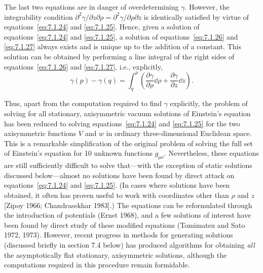 The last two equations are in danger of overdetermining \(\gamma\). However, the
integrability condition
\(\partial^2\gamma/\partial z\partial\rho=
\partial^2\gamma/\partial\rho\partial z\) is identically satisfied by virtue of
equations~\eqref{eq:7.1.24} and \eqref{eq:7.1.25}. Hence, given a solution of
equations~\eqref{eq:7.1.24} and \eqref{eq:7.1.25}, a solution of
equations~\eqref{eq:7.1.26} and \eqref{eq:7.1.27} always exists and is unique up to
the addition of a constant. This solution can be obtained by performing a line
integral of the right sides of equations~\eqref{eq:7.1.26} and \eqref{eq:7.1.27},
i.e., explicitly,
\begin{equation}
  \gamma(p)-\gamma(q)=\int_q^p
    \left(\frac{\partial\gamma}{\partial\rho}\dd\rho
          +\frac{\partial\gamma}{\partial z}\dd z\right) .
  \tag{7.1.28}\label{eq:7.1.28}
\end{equation}

Thus, apart from the computation required to find \(\gamma\) explicitly, the problem
of solving for all stationary, axisymmetric vacuum solutions of Einstein's equation
has been reduced to solving equations~\eqref{eq:7.1.24} and \eqref{eq:7.1.25} for
the two axisymmetric functions \(V\) and \(w\) in ordinary three-dimensional
Euclidean space. This is a remarkable simplification of the original problem of
solving the full set of Einstein's equation for 10 unknown functions \(g_{\mu\nu}\).
Nevertheless, these equations are still sufficiently difficult to solve that---with the
exception of static solutions discussed below---almost no solutions have been found
by direct attack on equations~\eqref{eq:7.1.24} and \eqref{eq:7.1.25}. (In cases
where solutions have been obtained, it often has proven useful to work with
coordinates other than \(\rho\) and \(z\) [Zipoy 1966; Chandrasekhar 1983].) The
equations can be reformulated through the introduction of potentials (Ernst 1968),
and a few solutions of interest have been found by direct study of these modified
equations (Tomimatsu and Sato 1972, 1973). However, recent progress in methods
for generating solutions (discussed briefly in section 7.4 below) has produced
algorithms for obtaining \emph{all} the asymptotically flat stationary, axisymmetric
solutions, although the computations required in this procedure remain formidable.

